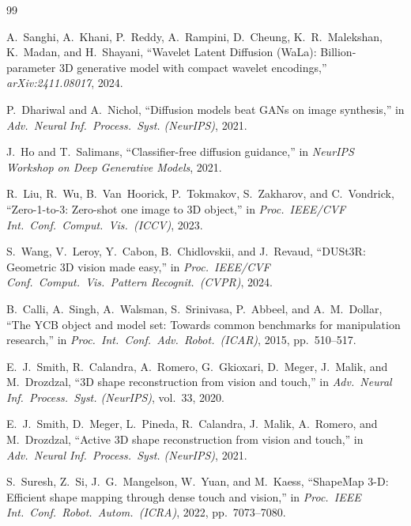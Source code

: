 \documentclass[conference]{IEEEtran}
\begin{document}
\balance
\begin{thebibliography}{99}


A.~Sanghi, A.~Khani, P.~Reddy, A.~Rampini, D.~Cheung, K.~R.~Malekshan, K.~Madan, and
H.~Shayani, ``Wavelet Latent Diffusion (WaLa): Billion-parameter 3D generative model
with compact wavelet encodings,'' \emph{arXiv:2411.08017}, 2024.

P.~Dhariwal and A.~Nichol, ``Diffusion models beat GANs on image synthesis,'' in
\emph{Adv.\ Neural Inf.\ Process.\ Syst. (NeurIPS)}, 2021.

J.~Ho and T.~Salimans, ``Classifier-free diffusion guidance,'' in \emph{NeurIPS
Workshop on Deep Generative Models}, 2021.

R.~Liu, R.~Wu, B.~Van~Hoorick, P.~Tokmakov, S.~Zakharov, and C.~Vondrick,
``Zero-1-to-3: Zero-shot one image to 3D object,'' in \emph{Proc.\ IEEE/CVF Int.\
Conf.\ Comput.\ Vis.\ (ICCV)}, 2023.

S.~Wang, V.~Leroy, Y.~Cabon, B.~Chidlovskii, and J.~Revaud, ``DUSt3R: Geometric 3D
vision made easy,'' in \emph{Proc.\ IEEE/CVF Conf.\ Comput.\ Vis.\ Pattern Recognit.\
(CVPR)}, 2024.

B.~Calli, A.~Singh, A.~Walsman, S.~Srinivasa, P.~Abbeel, and A.~M.~Dollar, ``The YCB
object and model set: Towards common benchmarks for manipulation research,'' in
\emph{Proc.\ Int.\ Conf.\ Adv.\ Robot.\ (ICAR)}, 2015, pp.~510--517.

\bibitem{smith2020}
E.~J.~Smith, R.~Calandra, A.~Romero, G.~Gkioxari, D.~Meger, J.~Malik, and
M.~Drozdzal, ``3D shape reconstruction from vision and touch,'' in \emph{Adv.\ Neural
Inf.\ Process.\ Syst. (NeurIPS)}, vol.~33, 2020.

E.~J.~Smith, D.~Meger, L.~Pineda, R.~Calandra, J.~Malik, A.~Romero, and M.~Drozdzal,
``Active 3D shape reconstruction from vision and touch,'' in \emph{Adv.\ Neural Inf.\
Process.\ Syst. (NeurIPS)}, 2021.

\bibitem{suresh2022}
S.~Suresh, Z.~Si, J.~G.~Mangelson, W.~Yuan, and M.~Kaess, ``ShapeMap 3-D: Efficient
shape mapping through dense touch and vision,'' in \emph{Proc.\ IEEE Int.\ Conf.\
Robot.\ Autom.\ (ICRA)}, 2022, pp.~7073--7080.


\end{thebibliography}
\end{document}
